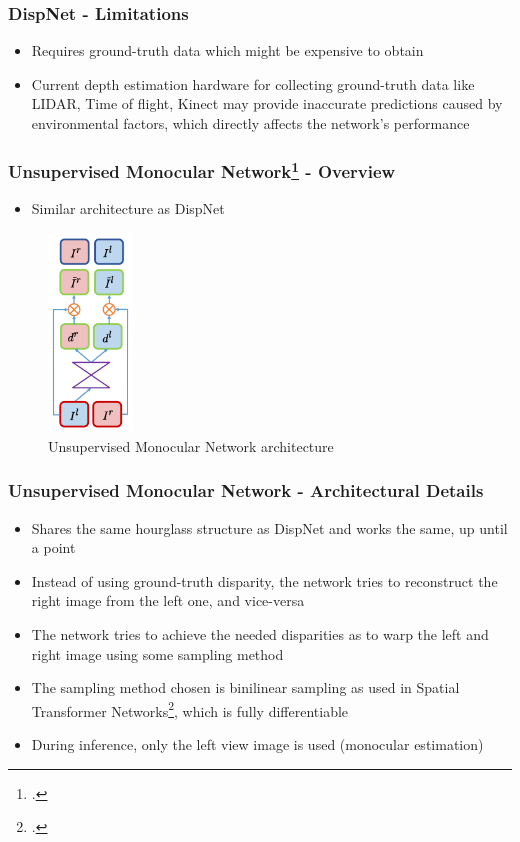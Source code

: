 \documentclass{beamer}
\begin{document}
\begin{frame}
\frametitle{DispNet - Limitations}
\center
\begin{itemize}
	\item Requires ground-truth data which might be expensive to obtain
	\item Current depth estimation hardware for collecting ground-truth data like LIDAR, Time of flight, Kinect may provide inaccurate predictions caused by environmental factors, which directly affects the network's performance
\end{itemize}
\end{frame}

\begin{frame}
\frametitle{Unsupervised Monocular Network\footcite{DBLP:journals/corr/GodardAB16} - Overview}
\center
\begin{itemize}
	\item Similar architecture as DispNet
\end{itemize}
\begin{figure}
    \centering
        \includegraphics[width=0.2\textwidth, height=0.5\textheight]{monodepth.png}
        \caption{Unsupervised Monocular Network architecture}
    \end{figure}
\end{frame}

\begin{frame}
\frametitle{Unsupervised Monocular Network - Architectural Details}
\center
\begin{itemize}
	\item Shares the same hourglass structure as DispNet and works the same, up until a point
	\item Instead of using ground-truth disparity, the network tries to reconstruct the right image from the left one, and vice-versa
	\item The network tries to achieve the needed disparities as to warp the left and right image using some sampling method
	\item The sampling method chosen is binilinear sampling as used in Spatial Transformer Networks\footcite{DBLP:journals/corr/JaderbergSZK15}, which is fully differentiable
	\item During inference, only the left view image is used (monocular estimation)
\end{itemize}
\end{frame}
\end{document}
